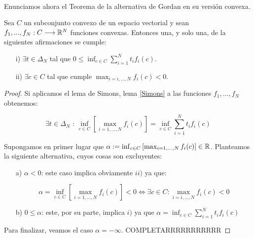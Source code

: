 	\paragraph{}Enunciamos ahora el Teorema de la alternativa de Gordan en su versión convexa.
	
	\begin{teoremaBox}
		Sea $ C $ un subconjunto convexo de un espacio vectorial y sean $ f_1,...,f_N : C \longrightarrow \mathbb{R}^N $ funciones convexas. Entonces una, y solo una, de la siguientes afirmaciones se cumple:
		\begin{itemize}
			\item[i)] $ \exists t \in \Delta_N $ tal que $ 0 \leq \inf_{c \in C}  \sum_{i=1}^{N}{t_i f_i(c)}$.
			\item[ii)] $ \exists c \in C $ tal que cumple $ \max_{i=i,...,N}f_i (c) < 0 $.
		\end{itemize}
	\end{teoremaBox}
	\begin{proof}
		Si aplicamos el lema de Simons, lema \ref{Simons} a las funciones $ f_1,...,f_N $ obtenemos:
		
		\begin{equation*}
			\exists t \in \Delta_N \text{ : } \inf_{c \in C}\left[ \max_{i=1,...,N}f_i(c)\right] = \inf_{c \in C} \sum_{i=1}^{N}t_i f_i(c)
		\end{equation*}
		
		Supongamos en primer lugar que $ \alpha := \inf_{c \in C}\left[ \max_{i=1,...,N}f_i(c)\right] \in \mathbb{R} $. Planteamos la siguiente alternativa, cuyos cosas son excluyentes:
		\begin{itemize}
			\item[a)] $ \alpha < 0 $: este caso implica obviamente $ ii) $ ya que:
			
			\begin{equation*}
				\alpha = \inf_{c \in C}\left[ \max_{i=1,...,N}f_i(c)\right] < 0 \Longleftrightarrow \exists c \in C  : \max_{i=i,...,N}f_i (c) < 0 
			\end{equation*}  
			\item[b)] $ 0 \leq \alpha $: este, por su parte, implica $ i) $ ya que $ \alpha = \inf_{c \in C} \sum_{i=1}^{N}t_i f_i(c) $ 
		\end{itemize}
	
		Para finalizar, veamos el caso $ \alpha =-\infty $. COMPLETARRRRRRRRRRR
	\end{proof}

